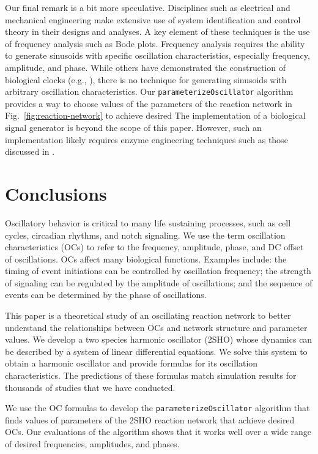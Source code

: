 \documentclass{bmcart}
\newcommand{\fig}[1]{Fig.~\ref{#1}}
\begin{document}
Our final remark is a bit more speculative. Disciplines such as electrical and mechanical engineering make extensive use of system identification and control theory in their designs and analyses. A key element of these techniques is the use of frequency analysis such as Bode plots. Frequency analysis requires the ability to generate sinusoids with specific oscillation characteristics, especially frequency, amplitude, and phase. While others have demonstrated the construction of biological clocks (e.g., \cite{chuang_synthesizing_2014, chavan_reconstitution_2021}), there is no technique for generating sinusoids with arbitrary oscillation characteristics. Our {\tt parameterizeOscillator} algorithm provides a way to choose values of the parameters of the reaction network in \fig{fig:reaction-network} to achieve desired The implementation of a biological signal generator is beyond the scope of this paper. However, such an implementation likely requires enzyme engineering techniques such as those discussed in \cite{novichkov_autocatalytic_2021}.

\section*{Conclusions}
Oscillatory behavior is critical to many life sustaining processes, such as cell cycles, circadian rhythms, and notch signaling. We use the term oscillation characteristics (OCs) to refer to the frequency, amplitude, phase, and DC offset of oscillations. OCs affect many biological functions. Examples include: the timing of event initiations can be controlled by oscillation frequency; the strength of signaling can be regulated by the amplitude of oscillations; and the sequence of events can be determined by the phase of oscillations.

This paper is a theoretical study of an oscillating reaction network to better understand the relationships between OCs and network structure and parameter values. We develop a two species harmonic oscillator (2SHO) whose dynamics can be described by a system of linear differential equations. We solve this system to obtain a harmonic oscillator and provide formulas for its oscillation characteristics. The predictions of these formulas match simulation results for thousands of studies that we have conducted.

We use the OC formulas to develop the {\tt parameterizeOscillator} algorithm that finds values of parameters of the 2SHO reaction network that achieve desired OCs. Our evaluations of the algorithm shows that it works well over a wide range of desired frequencies, amplitudes, and phases.
\end{document}
